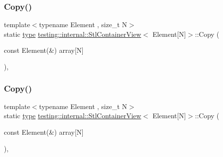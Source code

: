 \mbox{\label{classtesting_1_1internal_1_1_stl_container_view_3_01_element[_n]_4_af2cf79fbd7f829229a47b52f863c68f8}} 
\subsubsection{\texorpdfstring{Copy()}{Copy()}\hspace{0.1cm}{\footnotesize\ttfamily [2/3]}}
{\footnotesize\ttfamily template$<$typename Element , size\+\_\+t N$>$ \\
static \mbox{\hyperlink{classtesting_1_1internal_1_1_stl_container_view_3_01_element[_n]_4_a364efca99cc5a02829b4e3413c506b09}{type}} \mbox{\hyperlink{classtesting_1_1internal_1_1_stl_container_view}{testing\+::internal\+::\+Stl\+Container\+View}}$<$ Element\mbox{[}N\mbox{]}$>$\+::Copy (\begin{DoxyParamCaption}\item[{const Element(\&)}]{array\mbox{[}\+N\mbox{]} }\end{DoxyParamCaption})\hspace{0.3cm}{\ttfamily [inline]}, {\ttfamily [static]}}

\mbox{\label{classtesting_1_1internal_1_1_stl_container_view_3_01_element[_n]_4_af2cf79fbd7f829229a47b52f863c68f8}} 
\subsubsection{\texorpdfstring{Copy()}{Copy()}\hspace{0.1cm}{\footnotesize\ttfamily [3/3]}}
{\footnotesize\ttfamily template$<$typename Element , size\+\_\+t N$>$ \\
static \mbox{\hyperlink{classtesting_1_1internal_1_1_stl_container_view_3_01_element[_n]_4_a364efca99cc5a02829b4e3413c506b09}{type}} \mbox{\hyperlink{classtesting_1_1internal_1_1_stl_container_view}{testing\+::internal\+::\+Stl\+Container\+View}}$<$ Element\mbox{[}N\mbox{]}$>$\+::Copy (\begin{DoxyParamCaption}\item[{const Element(\&)}]{array\mbox{[}\+N\mbox{]} }\end{DoxyParamCaption})\hspace{0.3cm}{\ttfamily [inline]}, {\ttfamily [static]}}

